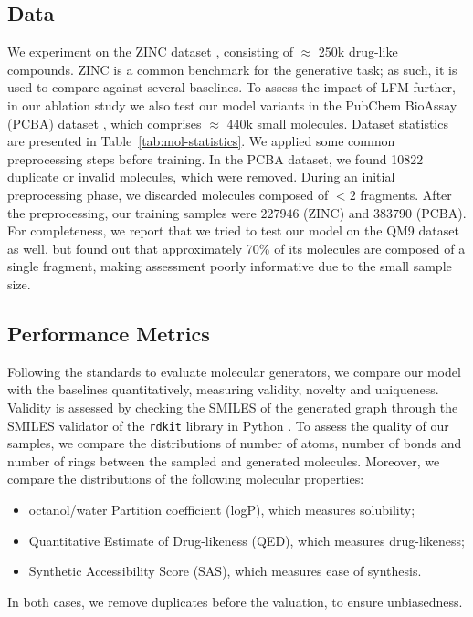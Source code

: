 \subsection{Data}
We experiment on the ZINC dataset \citep{irwin2005zinc}, consisting of $\approx$ 250k drug-like compounds. ZINC is a common benchmark for the generative task; as such, it is used to compare against several baselines. To assess the impact of LFM further, in our ablation study we also test our model variants in the PubChem BioAssay (PCBA) dataset  \citep{gindulyte2016pubchem}, which comprises $\approx$ 440k small molecules. Dataset statistics are presented in Table~\ref{tab:mol-statistics}. We applied some common preprocessing steps before training. In the PCBA dataset, we found 10822 duplicate or invalid molecules, which were removed. During an initial preprocessing phase, we discarded molecules composed of $< 2$ fragments. After the preprocessing, our training samples were $227946$ (ZINC) and $383790$ (PCBA). For completeness, we report that we tried to test our model on the QM9 dataset \citep{ramakrishnan2014qm9} as well, but found out that approximately 70\% of its molecules are composed of a single fragment, making assessment poorly informative due to the small sample size.


\subsection{Performance Metrics}
Following the standards to evaluate molecular generators, we compare our model with the baselines quantitatively, measuring validity, novelty and uniqueness. Validity is assessed by checking the SMILES of the generated graph through the SMILES validator of the \texttt{rdkit} library in Python \citep{rdkit}. To assess the quality of our samples, we compare the distributions of number of atoms, number of bonds and number of rings between the sampled and generated molecules. Moreover, we compare the distributions of the following molecular properties:
\begin{itemize}
    \item octanol/water Partition coefficient (logP), which measures solubility;
    \item Quantitative Estimate of Drug-likeness \citep{bickerton2012qed} (QED), which measures drug-likeness;
    \item Synthetic Accessibility Score \citep{ertl2009sas} (SAS), which measures ease of synthesis.
\end{itemize}
In both cases, we remove duplicates before the valuation, to ensure unbiasedness.
